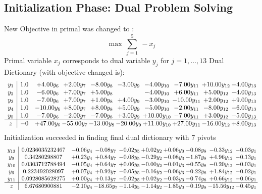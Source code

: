 \documentclass[9pt]{article}
\begin{document}
\subsection{Initialization Phase: Dual Problem Solving}
New Objective in primal was changed to : \[ \max\ \sum_{j=1}^{5}\ - x_j \] 
Primal variable $x_j$ corresponds to dual variable $y_j$ for $j = 1,\ldots,13$
Dual Dictionary (with objective changed is): 
\[\begin{array}{c| c c@{\hskip 2pt} c@{\hskip 2pt} c@{\hskip 2pt} c@{\hskip 2pt} c@{\hskip 2pt} c@{\hskip 2pt} c@{\hskip 2pt} c@{\hskip 2pt} }
 y_{1}   &  1.0 & +  4.00 y_{6} & +  2.00 y_{7} & -8.00 y_{8} & -3.00 y_{9} & -4.00 y_{10} & -7.00 y_{11} & + 10.00 y_{12} & -4.00 y_{13}\\
 y_{2}   &  1.0 & -6.00 y_{6} & +  7.00 y_{7} & +  5.00 y_{8} &   & -4.00 y_{10} & +  6.00 y_{11} & +  5.00 y_{12} & -4.00 y_{13}\\
 y_{3}   &  1.0 & -7.00 y_{6} & +  7.00 y_{7} & +  1.00 y_{8} & +  4.00 y_{9} & -3.00 y_{10} & -10.00 y_{11} & +  2.00 y_{12} & +  9.00 y_{13}\\
 y_{4}   &  1.0 & -10.00 y_{6} & +  8.00 y_{7} & +  8.00 y_{8} & +  5.00 y_{9} & -5.00 y_{10} & -2.00 y_{11} & -8.00 y_{12} & -6.00 y_{13}\\
 y_{5}   &  1.0 & -7.00 y_{6} & -2.00 y_{7} & -7.00 y_{8} & +  3.00 y_{9} & + 10.00 y_{10} & -7.00 y_{11} & +  3.00 y_{12} & -5.00 y_{13}\\
\hline
z    &  -0 & + 47.00 y_{6} & -55.00 y_{7} & -13.00 y_{8} & -20.00 y_{9} & + 11.00 y_{10} & + 27.00 y_{11} & -16.00 y_{12} & +  8.00 y_{13}\\
\end{array}\]
Initialization succeeded in finding final dual dictionary with 7 pivots
\[\begin{array}{c| c c@{\hskip 2pt} c@{\hskip 2pt} c@{\hskip 2pt} c@{\hskip 2pt} c@{\hskip 2pt} c@{\hskip 2pt} c@{\hskip 2pt} c@{\hskip 2pt} }
 y_{13}   &  0.0236035232467 & -0.06 y_{4} & -0.08 y_{7} & -0.02 y_{5} & +  0.02 y_{2} & +  0.06 y_{3} & -0.08 y_{8} & -0.33 y_{12} & -0.03 y_{1}\\
 y_{9}   &  0.34280298807 & +  0.23 y_{4} & +  0.84 y_{7} & -0.08 y_{5} & -0.29 y_{2} & -0.08 y_{3} & -1.87 y_{8} & +  4.96 y_{12} & -0.13 y_{1}\\
 y_{10}   &  0.0303712788494 & -0.05 y_{4} & +  0.64 y_{7} & +  0.06 y_{5} & -0.00 y_{2} & -0.01 y_{3} & +  0.55 y_{8} & -0.20 y_{12} & -0.03 y_{1}\\
 y_{6}   &  0.223492028097 & +  0.07 y_{4} & +  0.92 y_{7} & -0.05 y_{5} & -0.16 y_{2} & -0.06 y_{3} & -0.22 y_{8} & +  1.84 y_{12} & -0.02 y_{1}\\
 y_{11}   &  0.0928085628275 & +  0.00 y_{4} & +  0.13 y_{7} & -0.02 y_{5} & +  0.02 y_{2} & -0.03 y_{3} & -0.74 y_{8} & +  0.66 y_{12} & -0.06 y_{1}\\
\hline
z    &  6.67680900881 & -2.10 y_{4} & -18.65 y_{7} & -1.14 y_{5} & -1.14 y_{2} & -1.85 y_{3} & -0.19 y_{8} & -15.56 y_{12} & -0.45 y_{1}\\
\end{array}\]
\end{document}
